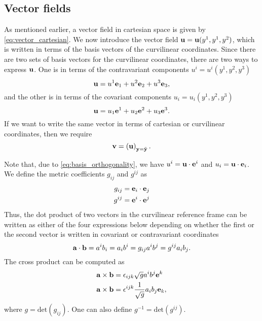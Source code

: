 \documentclass[11pt]{article}
\begin{document}
\subsection{Vector fields}
As mentioned earlier, a vector field in cartesian space is given by \cref{eq:vector_cartesian}. We now introduce the vector field $\mathbf{u} = \mathbf{u}(y^1, y^1, y^2)$, which is written in terms of the basis vectors of the curvilinear coordinates. Since there are two sets of basis vectors for the curvilinear coordinates, there are two ways to express $\mathbf{u}$. One is in terms of the contravariant components $u^i = u^i(y^1, y^2, y^3)$
\begin{equation}
    \mathbf{u} = u^1 \mathbf{e}_1 + u^2 \mathbf{e}_2 + u^3 \mathbf{e}_3,
\end{equation}
and the other is in terms of the covariant components $u_i = u_i(y^1, y^2, y^3)$
\begin{equation}
    \mathbf{u} = u_1 \mathbf{e}^1 + u_2 \mathbf{e}^2 + u_3 \mathbf{e}^3.
\end{equation}
If we want to write the same vector in terms of cartesian or curvilinear coordinates, then we require
\begin{equation}
    \mathbf{v} = \left( \mathbf{u} \right)_{\mathbf{y} = \tilde{\mathbf{y}}}.
\end{equation}

Note that, due to \cref{eq:basis_orthogonality}, we have $u^i = \mathbf{u} \cdot \mathbf{e}^i$ and $u_i = \mathbf{u} \cdot \mathbf{e}_i$. We define the metric coefficients $g_{ij}$ and $g^{ij}$ as
\begin{align}
    g_{ij} &= \mathbf{e}_i \cdot \mathbf{e}_j \\
    g^{ij} &= \mathbf{e}^i \cdot \mathbf{e}^j \\
\end{align}
Thus, the dot product of two vectors in the curvilinear reference frame can be written as either of the four expressions below depending on whether the first or the second vector is written in covariant or contravariant coordinates
\begin{equation}
\mathbf{a} \cdot \mathbf{b} = a^i b_i = a_i b^i = g_{ij} a^i b^j = g^{ij} a_i b_j.
\end{equation}
The cross product can be computed as
\begin{align}
    \mathbf{a} \times \mathbf{b} &= \epsilon_{ijk} \sqrt{g} a^i b^j \mathbf{e}^k \\
    \mathbf{a} \times \mathbf{b} &= \epsilon^{ijk} \frac{1}{\sqrt{g}} a_i b_j \mathbf{e}_k,
\end{align}
where $g = \text{det}(g_{ij})$. One can also define $g^{-1} = \text{det}(g^{ij})$.
\end{document}
